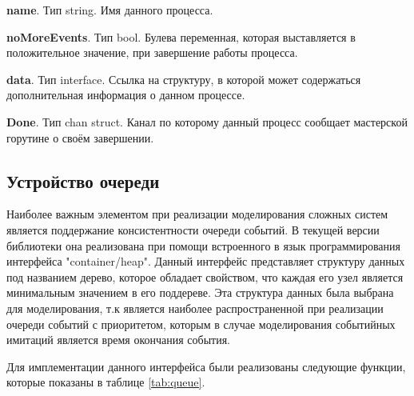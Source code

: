 \textbf{	name}. Тип         string. Имя данного процесса. 

\textbf{	noMoreEvents}. Тип bool. Булева переменная, которая выставляется в положительное значение, при завершение работы процесса.

\textbf{	data}. Тип         interface. Ссылка на  структуру, в  которой может содержаться дополнительная информация о данном процессе.

\textbf{	Done}. Тип chan struct. Канал по которому данный процесс сообщает мастерской горутине о своём завершении. 



\subsection{Устройство очереди}

Наиболее важным элементом при реализации моделирования сложных систем является поддержание консистентности очереди событий. В текущей версии библиотеки она реализована при помощи встроенного в язык программирования интерфейса "container/heap". Данный интерфейс представляет структуру данных под названием дерево, которое обладает свойством, что каждая его узел является минимальным значением в его поддереве. Эта структура данных была выбрана для моделирования, т.к является наиболее распространенной при реализации очереди событий с приоритетом, которым в случае моделирования событийных имитаций является время окончания события. 

Для имплементации данного интерфейса были реализованы следующие функции, которые показаны в таблице \ref{tab:queue}. 

